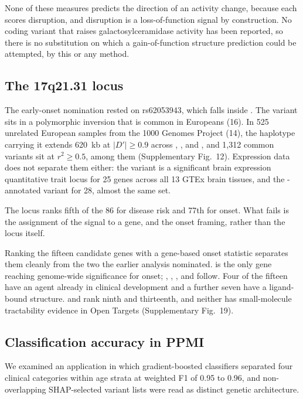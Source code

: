 \documentclass[10pt]{article}
\begin{document}
None of these measures predicts the direction of an activity change, because each scores
disruption, and disruption is a loss-of-function signal by construction. No coding variant that
raises galactosylceramidase activity has been reported, so there is no substitution on which a
gain-of-function structure prediction could be attempted, by this or any method.

\subsection*{The 17q21.31 locus}

The early-onset nomination rested on rs62053943, which falls inside . The variant sits in a polymorphic inversion that is common in Europeans (16). In 525 unrelated European samples from the 1000 Genomes Project (14),
the haplotype carrying it extends 620~kb at $|D'| \geq 0.9$ across , ,
 and , and 1,312 common variants sit at $r^2 \geq 0.5$,  among
them (Supplementary Fig.~12). Expression data does not separate them either: the variant is a significant brain
expression quantitative trait locus for 25 genes across all 13 GTEx brain tissues, and the
-annotated variant for 28, almost the same set.

The locus ranks fifth of the 86 for disease risk and 77th for onset. What fails is the assignment of the signal to a gene, and the onset framing, rather than the locus itself.

Ranking the fifteen candidate genes with a gene-based onset statistic separates them cleanly from
the two the earlier analysis nominated.  is the only gene reaching genome-wide
significance for onset; , , ,  and 
follow. Four of the fifteen have an agent already in clinical development and a further seven have
a ligand-bound structure.  and  rank ninth and thirteenth, and neither
has small-molecule tractability evidence in Open Targets (Supplementary Fig.~19).

\subsection*{Classification accuracy in PPMI}

We examined an application in which gradient-boosted classifiers separated four clinical
categories within age strata at weighted F1 of 0.95 to 0.96, and non-overlapping SHAP-selected
variant lists were read as distinct genetic architecture.
\end{document}
